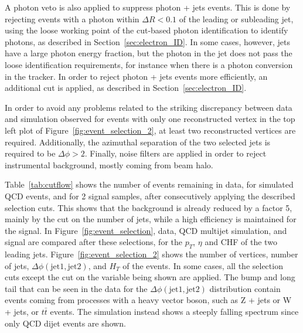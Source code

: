 A photon veto is also applied to suppress photon + jets events. This is done by rejecting events with a photon within $\Delta R < 0.1$ of the leading or subleading jet, using the loose working point of the cut-based photon identification to identify photons, as described in Section~\ref{sec:electron_ID}. In some cases, however, jets have a large photon energy fraction, but the photon in the jet does not pass the loose identification requirements, for instance when there is a photon conversion in the tracker. In order to reject photon + jets events more efficiently, an additional cut is applied, as described in Section~\ref{sec:electron_ID}.

In order to avoid any problems related to the striking discrepancy between data and simulation observed for events with only one reconstructed vertex in the top left plot of Figure~\ref{fig:event_selection_2}, at least two reconstructed vertices are required. Additionally, the azimuthal separation of the two selected jets is required to be $\Delta\phi > 2$. Finally, noise filters are applied in order to reject instrumental background, mostly coming from beam halo.

Table~\ref{tab:cutflow} shows the number of events remaining in data, for simulated QCD events, and for 2 signal samples, after consecutively applying the described selection cuts. This shows that the background is already reduced by a factor 5, mainly by the cut on the number of jets, while a high efficiency is maintained for the signal. In Figure~\ref{fig:event_selection}, data, \acs{QCD} multijet simulation, and signal are compared after these selections, for the $p_T$, $\eta$ and CHF of the two leading jets. Figure~\ref{fig:event_selection_2} shows the number of vertices, number of jets, $\Delta\phi(\mathrm{jet}1, \mathrm{jet}2)$, and $H_{T}$ of the events. In some cases, all the selection cuts except the cut on the variable being shown are applied. The bump and long tail that can be seen in the data for the $\Delta\phi(\mathrm{jet}1, \mathrm{jet}2)$ distribution contain events coming from processes with a heavy vector boson, such as Z + jets or W + jets, or $t\bar{t}$ events. The simulation instead shows a steeply falling spectrum since only \acs{QCD} dijet events are shown.

